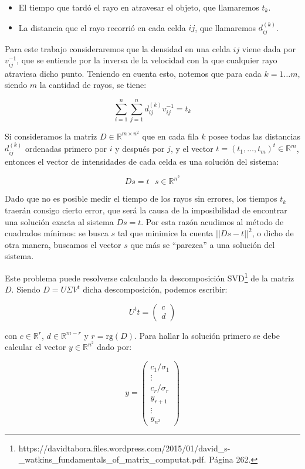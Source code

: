 \documentclass[a4paper]{article}
\begin{document}
\begin{itemize}
\item El tiempo que tardó el rayo en atravesar el objeto, que llamaremos $t_k$.
\item La distancia que el rayo recorrió en cada celda $ij$, que llamaremos $d_{ij}^{(k)}$.
\end{itemize}

Para este trabajo consideraremos que la densidad en una celda $ij$ viene dada por $v_{ij}^{-1}$, que se entiende por la inversa de la velocidad con 
la que cualquier rayo atraviesa dicho punto. Teniendo en cuenta esto, notemos que para cada $k = 1 \ldots m$, siendo $m$ la cantidad de rayos, se 
tiene:

\[
\sum_{i=1}^n \sum_{j=1}^n d_{ij}^{(k)} v_{ij}^{-1} = t_k
\]

Si consideramos la matriz $D \in \mathbb{R}^{m \times n^2}$ que en cada fila $k$ posee todas las distancias $d_{ij}^{(k)}$ ordenadas primero por 
$i$ y después por $j$, y el vector $t = (t_1,\ldots,t_m)^t \in \mathbb{R}^m$, entonces el vector de intensidades de cada celda es una solución del 
sistema:

\[
Ds = t \ \ \ s \in \mathbb{R}^{n^2}
\]

Dado que no es posible medir el tiempo de los rayos sin errores, los tiempos $t_k$ traerán consigo cierto error, que será la causa de la imposibilidad 
de encontrar una solución exacta al sistema $Ds = t$. Por esta razón acudimos al método de cuadrados mínimos: se busca $s$ tal que minimice la cuenta 
$||Ds - t||^2$, o dicho de otra manera, buscamos el vector $s$ que más se ``parezca'' a una solución del sistema.

Este problema puede resolverse calculando la descomposición 
SVD\footnote{https://davidtabora.files.wordpress.com/2015/01/david_s-_watkins_fundamentals_of_matrix_computat.pdf. Página 262.} de la matriz $D$. 
Siendo $D = U\Sigma V^t$ dicha descomposición, podemos escribir:

\[
U^t t = 
    \begin{pmatrix}
      c \\
      d
    \end{pmatrix}
\]

\noindent con $c \in \mathbb{R}^{r}$, $d \in \mathbb{R}^{m - r}$ y $r = \text{rg}(D)$. Para hallar la solución primero se debe calcular el vector 
$y \in \mathbb{R}^{n^2}$ dado por:

\[
y = 
    \begin{pmatrix}
      c_1/\sigma_1 \\
      \vdots       \\
      c_r/\sigma_r \\
      y_{r+1}      \\
      \vdots       \\
      y_{n^2}      
    \end{pmatrix}
\]
\end{document}
